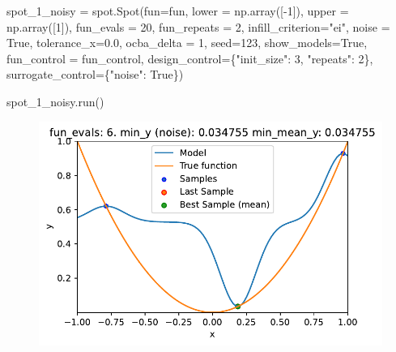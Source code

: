 \documentclass[
  letterpaper,
  DIV=11,
  numbers=noendperiod]{scrreprt}
\newenvironment{Shaded}{\begin{snugshade}}{\end{snugshade}}
\newcommand{\DecValTok}[1]{\textcolor[rgb]{0.68,0.00,0.00}{#1}}
\newcommand{\FloatTok}[1]{\textcolor[rgb]{0.68,0.00,0.00}{#1}}
\newcommand{\NormalTok}[1]{\textcolor[rgb]{0.00,0.23,0.31}{#1}}
\newcommand{\OperatorTok}[1]{\textcolor[rgb]{0.37,0.37,0.37}{#1}}
\newcommand{\StringTok}[1]{\textcolor[rgb]{0.13,0.47,0.30}{#1}}
\newcommand{\VariableTok}[1]{\textcolor[rgb]{0.07,0.07,0.07}{#1}}
\begin{document}
\begin{Shaded}
\begin{Highlighting}[]
\NormalTok{spot\_1\_noisy }\OperatorTok{=}\NormalTok{ spot.Spot(fun}\OperatorTok{=}\NormalTok{fun,}
\NormalTok{                   lower }\OperatorTok{=}\NormalTok{ np.array([}\OperatorTok{{-}}\DecValTok{1}\NormalTok{]),}
\NormalTok{                   upper }\OperatorTok{=}\NormalTok{ np.array([}\DecValTok{1}\NormalTok{]),}
\NormalTok{                   fun\_evals }\OperatorTok{=} \DecValTok{20}\NormalTok{,}
\NormalTok{                   fun\_repeats }\OperatorTok{=} \DecValTok{2}\NormalTok{,}
\NormalTok{                   infill\_criterion}\OperatorTok{=}\StringTok{"ei"}\NormalTok{,}
\NormalTok{                   noise }\OperatorTok{=} \VariableTok{True}\NormalTok{,}
\NormalTok{                   tolerance\_x}\OperatorTok{=}\FloatTok{0.0}\NormalTok{,}
\NormalTok{                   ocba\_delta }\OperatorTok{=} \DecValTok{1}\NormalTok{,}
\NormalTok{                   seed}\OperatorTok{=}\DecValTok{123}\NormalTok{,}
\NormalTok{                   show\_models}\OperatorTok{=}\VariableTok{True}\NormalTok{,}
\NormalTok{                   fun\_control }\OperatorTok{=}\NormalTok{ fun\_control,}
\NormalTok{                   design\_control}\OperatorTok{=}\NormalTok{\{}\StringTok{"init\_size"}\NormalTok{: }\DecValTok{3}\NormalTok{,}
                                   \StringTok{"repeats"}\NormalTok{: }\DecValTok{2}\NormalTok{\},}
\NormalTok{                   surrogate\_control}\OperatorTok{=}\NormalTok{\{}\StringTok{"noise"}\NormalTok{: }\VariableTok{True}\NormalTok{\})}
\end{Highlighting}
\end{Shaded}

\begin{Shaded}
\begin{Highlighting}[]
\NormalTok{spot\_1\_noisy.run()}
\end{Highlighting}
\end{Shaded}

\begin{figure}[H]

{\centering \includegraphics{014_num_spot_ocba_files/figure-pdf/cell-6-output-1.pdf}

}

\end{figure}
\end{document}
